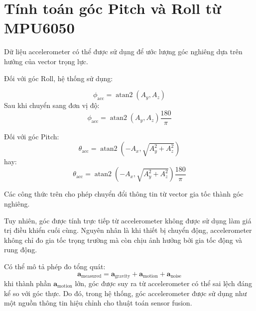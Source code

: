 
\section{Tính toán góc Pitch và Roll từ MPU6050}
\label{sec:pitch-roll}

Dữ liệu accelerometer có thể được sử dụng để ước lượng góc nghiêng dựa trên hướng của vector trọng lực.

Đối với góc Roll, hệ thống sử dụng:

\begin{equation}
\phi_{\text{acc}}
=
\operatorname{atan2}(A_y,A_z)
\end{equation}
Sau khi chuyển sang đơn vị độ:
\begin{equation}
\phi_{\text{acc}}
=
\operatorname{atan2}(A_y,A_z)
\frac{180}{\pi}
\end{equation}

Đối với góc Pitch:
\begin{equation}
\theta_{\text{acc}}
=
\operatorname{atan2}
\left(
-A_x,
\sqrt{A_y^2 + A_z^2}
\right)
\end{equation}
hay:
\begin{equation}
\theta_{\text{acc}}
=
\operatorname{atan2}
\left(
-A_x,
\sqrt{A_y^2 + A_z^2}
\right)
\frac{180}{\pi}
\end{equation}

Các công thức trên cho phép chuyển đổi thông tin từ vector gia tốc thành góc nghiêng.

Tuy nhiên, góc được tính trực tiếp từ accelerometer không được sử dụng làm giá trị điều khiển cuối cùng. Nguyên nhân là khi thiết bị chuyển động, accelerometer không chỉ đo gia tốc trọng trường mà còn chịu ảnh hưởng bởi gia tốc động và rung động.

Có thể mô tả phép đo tổng quát:
\begin{equation}
\mathbf{a}_{\text{measured}}
=
\mathbf{a}_{\text{gravity}}
+
\mathbf{a}_{\text{motion}}
+
\mathbf{a}_{\text{noise}}
\end{equation}
khi thành phần $\mathbf{a}_{\text{motion}}$ lớn, góc được suy ra từ accelerometer có thể sai lệch đáng kể so với góc thực. Do đó, trong hệ thống, góc accelerometer được sử dụng như một nguồn thông tin hiệu chỉnh cho thuật toán sensor fusion.


